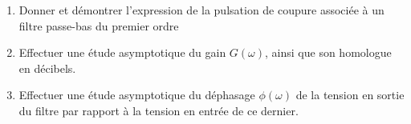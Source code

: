 \documentclass{article}
\begin{document}
\begin{adjustwidth}{-3cm}{-3cm}

    \begin{enumerate}[label=\textbf{\arabic*.}]
        \item Donner et démontrer l'expression de la pulsation de coupure associée à un filtre passe-bas du premier ordre
        \item Effectuer une étude asymptotique du gain $G(\omega)$, ainsi que son homologue en décibels.
        \item Effectuer une étude asymptotique du déphasage $\phi(\omega)$ de la tension en sortie du filtre par rapport à la tension en entrée de ce dernier.
    \end{enumerate}
    

\end{adjustwidth}
\end{document}
